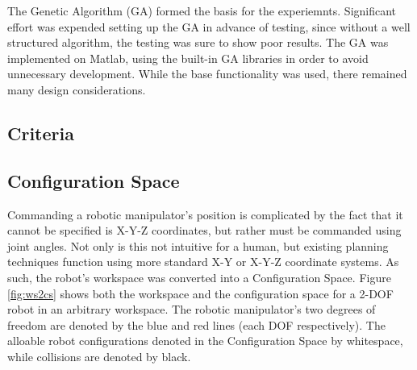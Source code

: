 	
		
			
		

The Genetic Algorithm (GA) formed the basis for the experiemnts. Significant effort was expended setting up the GA in advance of testing, since without a well structured algorithm, the testing was sure to show poor results. The GA was implemented on Matlab, using the built-in GA libraries in order to avoid unnecessary development. While the base functionality was used, there remained many design considerations.

\subsection{Criteria}

\subsection{Configuration Space}
Commanding a robotic manipulator's position is complicated by the fact that it cannot be specified is X-Y-Z coordinates, but rather must be commanded using joint angles. Not only is this not intuitive for a human, but existing planning techniques function using more standard X-Y or X-Y-Z coordinate systems. As such, the robot's workspace was converted into a Configuration Space. Figure \ref{fig:ws2cs} shows both the workspace and the configuration space for a 2-DOF robot in an arbitrary workspace. The robotic manipulator's two degrees of freedom are denoted by the blue and red lines (each DOF respectively). The alloable robot configurations denoted in the Configuration Space by whitespace, while collisions are denoted by black.

